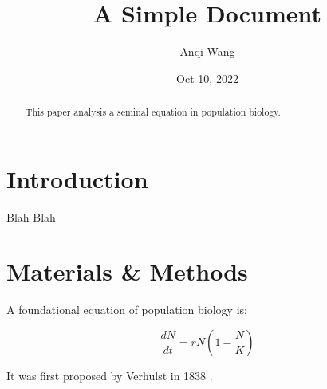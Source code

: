 \documentclass [12pt] {article}
\title{A Simple Document}
\author{Anqi Wang}
\date{Oct 10, 2022}							%
\begin{document}
    \maketitle
    
    \begin{abstract}
    This paper analysis a seminal equation in  population biology.
    \end{abstract}
    
    \section{Introduction}
    Blah Blah
    
    \section{Materials \& Methods}
    A foundational equation of population biology is:
    
    \begin{equation}
        \frac{dN}{dt} = r N (1 - \frac{N}{K})
    \end{equation}

It was first proposed by Verhulst in 1838 \cite{verhulst1838notice}.

    
    
    
    
\end{document}
